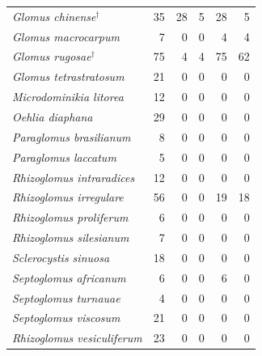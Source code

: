 {\begin{longtable}{lrrrrr}
\emph{Glomus chinense}$^{\dagger}$ & 35 & 28 & 5 & 28 & 5\\
\emph{Glomus macrocarpum} & 7 & 0 & 0 & 4 & 4\\
\emph{Glomus rugosae}$^{\dagger}$ & 75 & 4 & 4 & 75 & 62\\
\emph{Glomus tetrastratosum} & 21 & 0 & 0 & 0 & 0\\
\emph{Microdominikia litorea} & 12 & 0 & 0 & 0 & 0\\
\emph{Oehlia diaphana} & 29 & 0 & 0 & 0 & 0\\
\emph{Paraglomus brasilianum} & 8 & 0 & 0 & 0 & 0\\
\emph{Paraglomus laccatum} & 5 & 0 & 0 & 0 & 0\\
\emph{Rhizoglomus intraradices} & 12 & 0 & 0 & 0 & 0\\
\emph{Rhizoglomus irregulare} & 56 & 0 & 0 & 19 & 18\\
\emph{Rhizoglomus proliferum} & 6 & 0 & 0 & 0 & 0\\
\emph{Rhizoglomus silesianum} & 7 & 0 & 0 & 0 & 0\\
\emph{Sclerocystis sinuosa} & 18 & 0 & 0 & 0 & 0\\
\emph{Septoglomus africanum} & 6 & 0 & 0 & 6 & 0\\
\emph{Septoglomus turnauae} & 4 & 0 & 0 & 0 & 0\\
\emph{Septoglomus viscosum} & 21 & 0 & 0 & 0 & 0\\
\emph{Rhizoglomus vesiculiferum} & 23 & 0 & 0 & 0 & 0\\
\end{longtable}}
